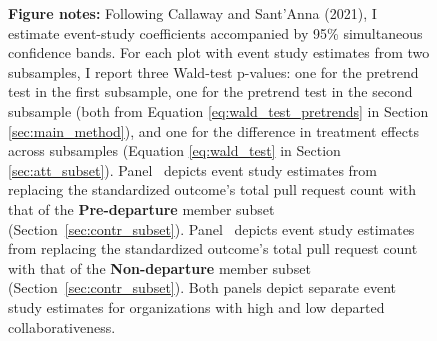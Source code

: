 \begin{figure}[htbp]
  \vspace{1ex}
  \centering
  \begin{minipage}{1\textwidth}
    \textbf{Figure notes:} 
    Following Callaway and Sant’Anna (2021), I estimate event-study coefficients accompanied by 95\% simultaneous confidence bands. For each plot with event study estimates from two subsamples, I report three Wald-test p-values: one for the pretrend test in the first subsample, one for the pretrend test in the second subsample (both from Equation \ref{eq:wald_test_pretrends} in Section \ref{sec:main_method}), and one for the difference in treatment effects across subsamples (Equation \ref{eq:wald_test} in Section \ref{sec:att_subset}). Panel~ depicts event study estimates from replacing the standardized outcome’s total pull request count with that of the \textbf{Pre-departure} member subset (Section~\ref{sec:contr_subset}). Panel~ depicts event study estimates from replacing the standardized outcome’s total pull request count with that of the \textbf{Non-departure} member subset (Section~\ref{sec:contr_subset}). Both panels depict separate event study estimates for organizations with high and low departed collaborativeness. 
  \end{minipage}
\end{figure}
